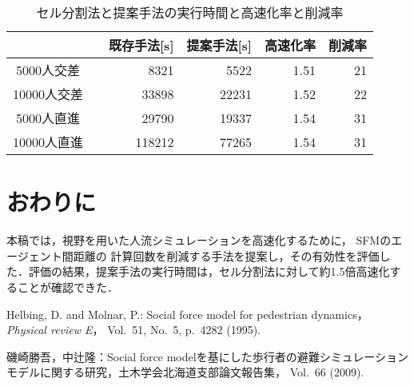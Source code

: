 \documentclass{maelab_y}
\begin{document}
\vspace{-1em}
\begin{table}[hbtp]
  \begin{center}
    \caption{セル分割法と提案手法の実行時間と高速化率と削減率}
    \label{tab:result}
    \begin{tabular}{c|c|c|c|c}
      \hline \hline
        &　既存手法[s] & 提案手法[s] & 高速化率 & 削減率 \\
      \hline
      5000人交差 & \multicolumn{1}{|r|}{8321} &
       \multicolumn{1}{|r|}{5522} &
       \multicolumn{1}{|r|}{1.51} &
       \multicolumn{1}{|r}{21} \\
      \hline
      10000人交差 &
      \multicolumn{1}{|r|}{33898} &
      \multicolumn{1}{|r|}{22231} &
      \multicolumn{1}{|r|}{1.52}  &
      \multicolumn{1}{|r}{22} \\
      \hline
      5000人直進 &
      \multicolumn{1}{|r|}{29790} &
      \multicolumn{1}{|r|}{19337} &
      \multicolumn{1}{|r|}{1.54}  &
      \multicolumn{1}{|r}{31} \\
      \hline
      10000人直進 &
      \multicolumn{1}{|r|}{118212} &
      \multicolumn{1}{|r|}{77265} &
      \multicolumn{1}{|r|}{1.54} &
      \multicolumn{1}{|r}{31}  \\
      \hline
    \end{tabular}
  \end{center}
\end{table}

\vspace{-1em}
\section{おわりに}
本稿では，視野を用いた人流シミュレーションを高速化するために，
SFMのエージェント間距離の
計算回数を削減する手法を提案し，その有効性を評価した．評価の結果，提案手法の実行時間は，セル分割法に対して約1.5倍高速化することが確認できた．

\begin{thebibliography}{9}
{\footnotesize

  Helbing, D. and Molnar, P.: Social force model for pedestrian dynamics，{\em
    Physical review E}， Vol.~51, No.~5, p.\ 4282 (1995).

  磯崎勝吾，中辻隆：Social force
  modelを基にした歩行者の避難シミュレーションモデルに関する研究，土木学会北海道支部論文報告集，
  Vol.~66 (2009).
}

\end{thebibliography}
\end{document}
